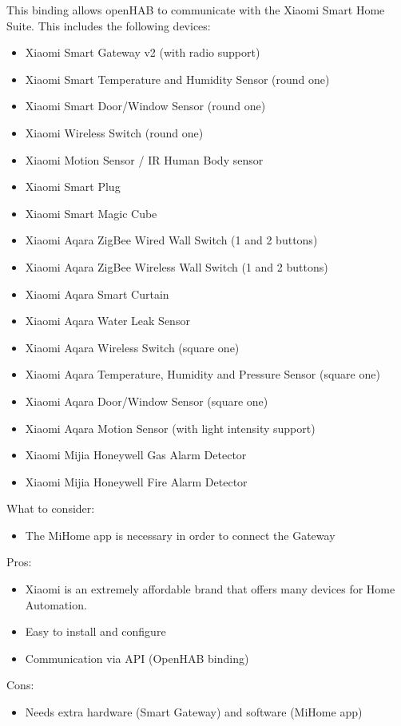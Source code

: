 This binding allows openHAB to communicate with the Xiaomi Smart Home Suite. This includes the following devices:
\begin{itemize}
	\item Xiaomi Smart Gateway v2 (with radio support)
	\item Xiaomi Smart Temperature and Humidity Sensor (round one)
	\item Xiaomi Smart Door/Window Sensor (round one)
	\item Xiaomi Wireless Switch (round one)
	\item Xiaomi Motion Sensor / IR Human Body sensor
	\item Xiaomi Smart Plug
	\item Xiaomi Smart Magic Cube
	\item Xiaomi Aqara ZigBee Wired Wall Switch (1 and 2 buttons)
	\item Xiaomi Aqara ZigBee Wireless Wall Switch (1 and 2 buttons)
	\item Xiaomi Aqara Smart Curtain
	\item Xiaomi Aqara Water Leak Sensor
	\item Xiaomi Aqara Wireless Switch (square one)
	\item Xiaomi Aqara Temperature, Humidity and Pressure Sensor (square one)
	\item Xiaomi Aqara Door/Window Sensor (square one)
	\item Xiaomi Aqara Motion Sensor (with light intensity support)
	\item Xiaomi Mijia Honeywell Gas Alarm Detector
	\item Xiaomi Mijia Honeywell Fire Alarm Detector
\end{itemize}
What to consider:
\begin{itemize}
	\item The MiHome app is necessary in order to connect the Gateway
\end{itemize}
Pros:
\begin{itemize}
	\item Xiaomi is an extremely affordable brand that offers many devices for Home Automation.
	\item Easy to install and configure
	\item Communication via API (OpenHAB binding)
\end{itemize}
Cons:
\begin{itemize}
	\item Needs extra hardware (Smart Gateway) and software (MiHome app)
\end{itemize}

